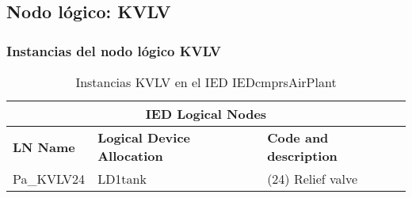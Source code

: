 
\subsection{Nodo l\'ogico: 			 KVLV}

    \subsubsection{Instancias del nodo l\'ogico KVLV}
    \begin{table}[H]
    \begin{center}
    \begin{tabular}{|l|l|p{6.8cm}|}
            \hline
            \multicolumn{3}{|c|}{\cellcolor[gray]{0.8} \textbf{IED Logical Nodes} } \\
            \hline
            \textbf{LN Name} & \textbf{Logical Device Allocation} & \textbf{Code and description} \\
            \hline
            Pa\_KVLV24 & LD1tank & (24) Relief valve \\
            \hline
    \end{tabular}
    \caption{Instancias KVLV en el IED IEDcmprsAirPlant}
    \label{table:lnInstKVLV_relief}
    \end{center}
    \end{table}
    
    
    
